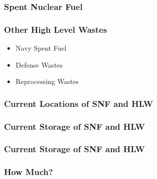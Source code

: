 
\begin{frame}[ctb!]
  \frametitle{Spent Nuclear Fuel}
  
\end{frame}

\begin{frame}[ctb!]
  \frametitle{Other High Level Wastes}
  \begin{itemize}
    \item Navy Spent Fuel
    \item Defense Wastes
    \item Reprocessing Wastes
  \end{itemize}
\end{frame}

\begin{frame}[ctb!]
  \frametitle{Current Locations of SNF and HLW}
  
\end{frame}

\begin{frame}[ctb!]
  \frametitle{Current Storage of SNF and HLW}
  
\end{frame}

\begin{frame}[ctb!]
  \frametitle{Current Storage of SNF and HLW}
  
\end{frame}

\begin{frame}[ctb!]
  \frametitle{How Much?}
  
\end{frame}

